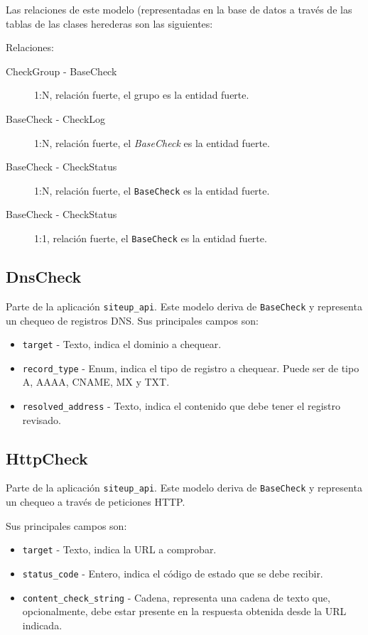 Las relaciones de este modelo (representadas en la base de datos a través de las
tablas de las clases herederas son las siguientes:

Relaciones:

\begin{description}
\item[CheckGroup - BaseCheck] 1:N, relación fuerte, el grupo es la entidad fuerte.
\item[BaseCheck - CheckLog] 1:N, relación fuerte, el \textit{BaseCheck} es la entidad fuerte.
\item[BaseCheck - CheckStatus] 1:N, relación fuerte, el \texttt{BaseCheck} es la entidad fuerte.
\item[BaseCheck - CheckStatus] 1:1, relación fuerte, el \texttt{BaseCheck} es la entidad fuerte.
\end{description}

\subsection{DnsCheck}

Parte de la aplicación \texttt{siteup\_api}. Este modelo deriva de
\texttt{BaseCheck} y representa un chequeo de registros DNS. Sus principales campos son:

\begin{itemize}
\item \texttt{target} - Texto, indica el dominio a chequear.
\item \texttt{record\_type} - Enum, indica el tipo de registro a chequear. Puede ser de tipo A, AAAA, CNAME, MX y TXT.
\item \texttt{resolved\_address} - Texto, indica el contenido que debe tener el registro revisado.
\end{itemize}

\subsection{HttpCheck}

Parte de la aplicación \texttt{siteup\_api}. Este modelo deriva de
\texttt{BaseCheck} y representa un chequeo a través de peticiones HTTP.

Sus principales campos son:

\begin{itemize}
\item \texttt{target} - Texto, indica la URL a comprobar.
\item \texttt{status\_code} - Entero, indica el código de estado que se debe recibir.
\item \texttt{content\_check\_string} - Cadena, representa una cadena de texto
  que, opcionalmente, debe estar presente en la respuesta obtenida desde la URL indicada.
\end{itemize}


